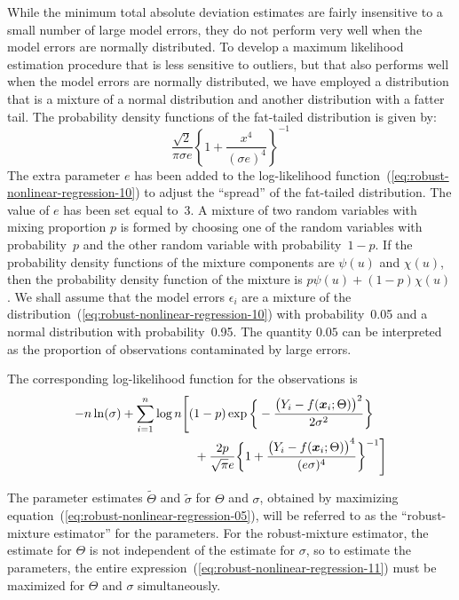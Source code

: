 \documentclass{admbmanual}
\begin{document}
While the minimum total absolute deviation estimates are fairly insensitive to a
small number of large model errors, they do not perform very well when the model
errors are normally distributed. To develop a maximum likelihood estimation
procedure that is less sensitive to outliers, but that also performs well when
the model errors are normally distributed, we have employed a distribution that
is a mixture of a normal distribution and another distribution with a fatter
tail. The probability density functions of the fat-tailed distribution is given
by:
\begin{equation}
  \label{eq:robust-nonlinear-regression-10} %
  \frac{\sqrt{2}}{\pi\sigma e}\left\{1+\frac{x^4}{{(\sigma e)}^4}\right\}^{-1}
\end{equation}
The extra parameter $e$ has been added to the log-likelihood
function~(\ref{eq:robust-nonlinear-regression-10}) %
to adjust the ``spread'' of the fat-tailed distribution. The value of $e$ has
been set equal to~3. A mixture of two random variables with mixing proportion
$p$ is formed by choosing one of the random variables with probability~$p$ and
the other random variable with probability~$1-p$. If the probability density
functions of the mixture components are $\psi(u)$ and $\chi(u)$, then the
probability density function of the mixture is $p\psi(u)+(1-p)\chi(u)$. We shall
assume that the model errors $\epsilon_i$ are a mixture of the
distribution~(\ref{eq:robust-nonlinear-regression-10}) %
with probability~0.05 and a normal distribution with probability~0.95. The
quantity $0.05$ can be interpreted as the proportion of observations
contaminated by large errors.

The corresponding log-likelihood function for the observations is
\begin{align}
  \label{eq:robust-nonlinear-regression-11} %
  \nonumber -n\ln(\sigma)+\sum_{i=1}^n \log n
  & \Bigg[
  (1-p)\exp\bigg\{-\frac{\big(Y_i-f({\mbox{\boldmath $x$}}_i;\Theta)\big)^2}
  {2\sigma^2}\bigg\}\\
  & \quad + \frac{2p}{\sqrt{\pi} e}
  \bigg\{1+\frac{\big(Y_i-f({\mbox{\boldmath $x$}}_i;\Theta)\big)^4}
  {(e\sigma)^4}\bigg\}^{-1}
  \Bigg]
\end{align}

The parameter estimates $\widetilde\Theta$ and $\tilde\sigma$ for $\Theta$ and
$\sigma$, obtained by maximizing
equation~(\ref{eq:robust-nonlinear-regression-05}), %
will be referred to as the ``robust-mixture estimator'' for the parameters. For
the robust-mixture estimator, the estimate for $\Theta$ is not independent of
the estimate for $\sigma$, so to estimate the parameters, the entire
expression~(\ref{eq:robust-nonlinear-regression-11}) %
must be maximized for $\Theta$ and $\sigma$ simultaneously.
\end{document}
